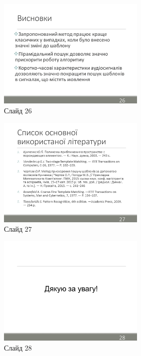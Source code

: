 \documentclass[pdftex]{thesis_utf8}
\begin{document}
\begin{figure}[h]
    \centering
    \includegraphics[width=0.63\textwidth]{slides/slide26.png}
    \caption{Слайд 26}
\end{figure}
\clearpage

\begin{figure}[h]
    \centering
    \includegraphics[width=0.63\textwidth]{slides/slide27.png}
    \caption{Слайд 27}
\end{figure}

\begin{figure}[h]
    \centering
    \includegraphics[width=0.63\textwidth]{slides/slide28.png}
    \caption{Слайд 28}
\end{figure}
\end{document}
